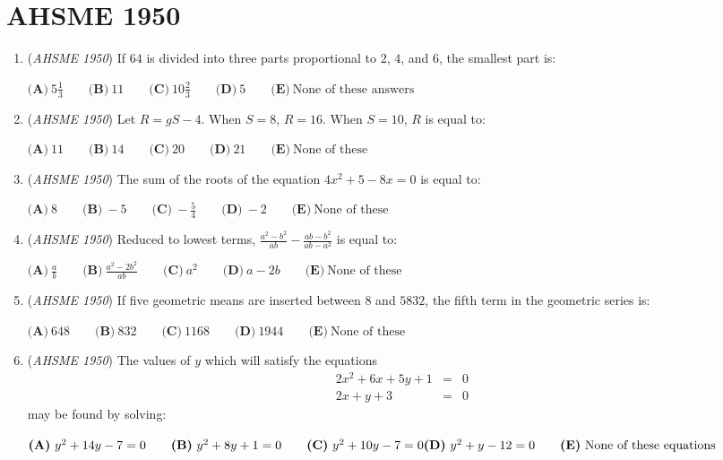 \section{AHSME 1950}
        \begin{enumerate}
        	\item (\textit{AHSME 1950}) If $64$ is divided into three parts proportional to $2$, $4$, and $6$, the smallest part is:


 $\textbf{(A)}\ 5\frac{1}{3}\qquad\textbf{(B)}\ 11\qquad\textbf{(C)}\ 10\frac{2}{3}\qquad\textbf{(D)}\ 5\qquad\textbf{(E)}\ \text{None of these answers}$


	\item (\textit{AHSME 1950}) Let $R=gS-4$. When $S=8$, $R=16$. When $S=10$, $R$ is equal to:


 $\textbf{(A)}\ 11\qquad\textbf{(B)}\ 14\qquad\textbf{(C)}\ 20\qquad\textbf{(D)}\ 21\qquad\textbf{(E)}\ \text{None of these}$


	\item (\textit{AHSME 1950}) The sum of the roots of the equation $4x^{2}+5-8x=0$ is equal to:


 $\textbf{(A)}\ 8\qquad\textbf{(B)}\ -5\qquad\textbf{(C)}\ -\frac{5}{4}\qquad\textbf{(D)}\ -2\qquad\textbf{(E)}\ \text{None of these}$


	\item (\textit{AHSME 1950}) Reduced to lowest terms, $\frac{a^{2}-b^{2}}{ab} - \frac{ab-b^{2}}{ab-a^{2}}$ is equal to:


 $\textbf{(A)}\ \frac{a}{b}\qquad\textbf{(B)}\ \frac{a^{2}-2b^{2}}{ab}\qquad\textbf{(C)}\ a^{2}\qquad\textbf{(D)}\ a-2b\qquad\textbf{(E)}\ \text{None of these}$


	\item (\textit{AHSME 1950}) If five geometric means are inserted between $8$ and $5832$, the fifth term in the geometric series is:


 $\textbf{(A)}\ 648\qquad\textbf{(B)}\ 832\qquad\textbf{(C)}\ 1168\qquad\textbf{(D)}\ 1944\qquad\textbf{(E)}\ \text{None of these}$


	\item (\textit{AHSME 1950}) The values of $y$ which will satisfy the equations 
 \[\begin{array}{rcl} 2x^{2}+6x+5y+1&=&0\\ 2x+y+3&=&0 \end{array}\] may be found by solving:


 $\textbf{(A)}\ y^{2}+14y-7=0\qquad\textbf{(B)}\ y^{2}+8y+1=0\qquad\textbf{(C)}\ y^{2}+10y-7=0\qquad\\ \textbf{(D)}\ y^{2}+y-12=0\qquad \textbf{(E)}\ \text{None of these equations}$



\end{enumerate}
